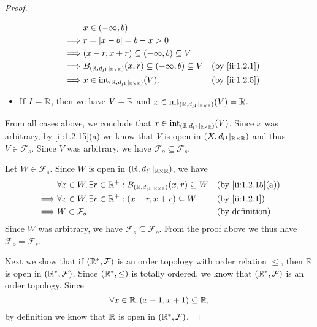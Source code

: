 \begin{proof}
\begin{itemize}
\begin{align*}
                     & x \in (-\infty, b)                                                                            \\
            \implies & r = \abs{x - b} = b - x > 0                                                                   \\
            \implies & (x - r, x + r) \subseteq (-\infty, b) \subseteq V                                             \\
            \implies & B_{(\R, d_{l^1}|_{\R \times \R})}(x, r) \subseteq (-\infty, b) \subseteq V &  & \by{ii:1.2.1} \\
            \implies & x \in \text{int}_{(\R, d_{l^1}|_{\R \times \R})}(V).                       &  & \by{ii:1.2.5}
          \end{align*}
    \item If \(I = \mathbb{R}\), then we have \(V = \mathbb{R}\) and \(x \in \text{int}_{(\mathbb{R}, d_{l^1}|_{\mathbb{R} \times \mathbb{R}})}(V) = \mathbb{R}\).
  \end{itemize}
  From all cases above, we conclude that \(x \in \text{int}_{(\mathbb{R}, d_{l^1}|_{\mathbb{R} \times \mathbb{R}})}(V)\).
  Since \(x\) was arbitrary, by \cref{ii:1.2.15}(a) we know that \(V\) is open in \((X, d_{l^1}|_{\mathbb{R} \times \mathbb{R}})\) and thus \(V \in \mathcal{F}_s\).
  Since \(V\) was arbitrary, we have \(\mathcal{F}_o \subseteq \mathcal{F}_s\).

  Let \(W \in \mathcal{F}_s\).
  Since \(W\) is open in \((\mathbb{R}, d_{l^1}|_{\mathbb{R} \times \mathbb{R}})\), we have
  \begin{align*}
             & \forall x \in W, \exists r \in \R^+ : B_{(\R, d_{l^1}|_{\R \times \R})}(x, r) \subseteq W &  & \by{ii:1.2.15}[a]      \\
    \implies & \forall x \in W, \exists r \in \R^+ : (x - r, x + r) \subseteq W                          &  & \by{ii:1.2.1}          \\
    \implies & W \in \mathcal{F}_o.                                                                      &  & \text{(by definition)}
  \end{align*}
  Since \(W\) was arbitrary, we have \(\mathcal{F}_s \subseteq \mathcal{F}_o\).
  From the proof above we thus have \(\mathcal{F}_o = \mathcal{F}_s\).

  Next we show that if \((\mathbb{R}^*, \mathcal{F})\) is an order topology with order relation \(\leq\), then \(\mathbb{R}\) is open in \((\mathbb{R}^*, \mathcal{F})\).
  Since \((\mathbb{R}^*, \leq)\) is totally ordered, we know that \((\mathbb{R}^*, \mathcal{F})\) is an order topology.
  Since
  \[
    \forall x \in \mathbb{R}, (x - 1, x + 1) \subseteq \mathbb{R},
  \]
  by definition we know that \(\mathbb{R}\) is open in \((\mathbb{R}^*, \mathcal{F})\).


\end{proof}
